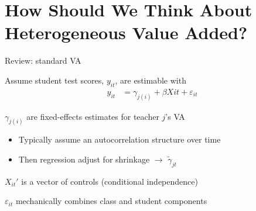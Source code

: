 \documentclass[t,aspectratio=169,11pt]{beamer}
\begin{document}

\section{How Should We Think About Heterogeneous Value Added?}





\begin{frame}{Review: standard VA}

    \vfill
    \begin{wideitemize}
    \item Assume student test scores, $y_{it}$, are estimable with
    \begin{align*}
        y_{it} &= \gamma_{j(i)} + \beta X{it} +  \varepsilon_{it}
    \end{align*}
    \item $\gamma_{j(i)}$ are fixed-effects estimates for teacher $j$'s VA 
    \begin{itemize}
        \item Typically assume an autocorrelation structure over time
        \item Then regression adjust for shrinkage $\to$ $\tilde{\gamma}_{jt}$
    \end{itemize}
    \item $X_{it}'$ is a vector of controls (conditional independence)
    \item $\varepsilon_{it}$ mechanically combines class and student components
    \end{wideitemize}
    \vfill
    
\end{frame}


\end{document}
